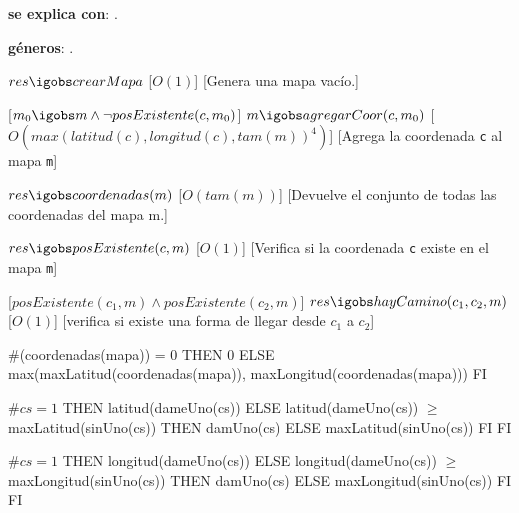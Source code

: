 \begin{Interfaz}


\textbf{se explica con}: .

\textbf{g\'eneros}: .



%
{$res \igobs crearMapa$}%
[$O(1)$]
[Genera una mapa vac\'io.]


[$m_0 \igobs m \land \lnot posExistente(c, m_0) $]  
{$m \igobs agregarCoor(c, m_0)$}
[$O(  max(latitud(c), longitud(c), tam(m))^4  )$]
[Agrega la coordenada \texttt{c} al mapa \texttt{m}]


%
{$res \igobs coordenadas(m)$}%
[$O(tam(m))$]  %
[Devuelve el conjunto de todas las coordenadas del mapa m.]


{$res \igobs posExistente(c, m)$}
[$O(1)$]
[Verifica si la coordenada \texttt{c} existe en el mapa \texttt{m}]


[$posExistente(c_1, m) \land posExistente(c_2, m) $]
{$res \igobs hayCamino(c_1, c_2, m)$}
[$O(1)$]
[verifica si existe una forma de llegar desde \texttt{$c_1$} a \texttt{$c_2$}]


  
\begin{tad}{}



{
\IF
$\#$(coordenadas(mapa)) = 0
THEN
0
ELSE
max(maxLatitud(coordenadas(mapa)), maxLongitud(coordenadas(mapa)))
FI
}


{
\IF
$\#cs = 1$
THEN
latitud(dameUno(cs))
ELSE
{
\IF latitud(dameUno(cs)) $\geq$ maxLatitud(sinUno(cs))
THEN
damUno(cs)
ELSE
maxLatitud(sinUno(cs))
FI
}
FI}


{
\IF
$\#cs = 1$
THEN
longitud(dameUno(cs))
ELSE
{
\IF longitud(dameUno(cs)) $\geq$ maxLongitud(sinUno(cs))
THEN
damUno(cs)
ELSE
maxLongitud(sinUno(cs))
FI
}
FI}


\end{tad}



\end{Interfaz}


